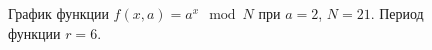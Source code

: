\begin{figure}
\centering



\caption{График функции $f\left(x, a\right) = a^x \mod{N}$ при $a=2$, $N
  = 21$. Период функции $r=6$.}
\label{picPart4QuantCompShorClassPart}
\end{figure}
